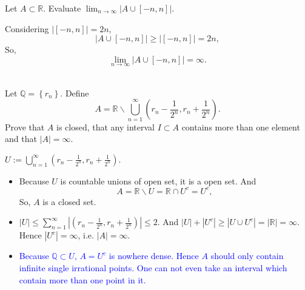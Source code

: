 \documentclass[en, normal, 11pt, black]{elegantnote}
\newenvironment{exercise}[1]{\begin{tcolorbox}[colback=black!15, colframe=black!80, breakable, title=#1]}{\end{tcolorbox}}
\renewenvironment{proof}{\begin{tcolorbox}[colback=white, colframe=black!50, breakable, title=Proof. ]\setlength{\parskip}{0.8em}}{\,\\\rightline{$\square$}\end{tcolorbox}}
\begin{document}
\begin{exercise}{(6), }
    Let $A \subset \mathbb{R}$. Evaluate $\lim _{n \rightarrow \infty}|A \cup[-n, n]|$. 
\end{exercise}

\begin{proof}
    Considering $|[-n,n]|=2n$, 
    \[|A\cup[-n,n]|\geqslant|[-n,n]|=2n, \]
    So, 
    \[\lim _{n \rightarrow \infty}|A \cup[-n, n]|=\infty. \]
    \vspace{-30pt}
\end{proof}

\begin{exercise}{(7), }
    Let $\mathbb{Q}=\left\{r_{n}\right\}$. Define
    \[
        A=\mathbb{R} \backslash \bigcup_{n=1}^{\infty}\left(r_{n}-\frac{1}{2^{n}}, r_{n}+\frac{1}{2^{n}}\right). 
    \]
    Prove that $A$ is closed, that any interval $I \subset A$ contains more than one element and that $|A|=\infty$. 
\end{exercise}
\begin{proof}
    $U:=\bigcup_{n=1}^{\infty}\left(r_{n}-\frac{1}{2^{n}}, r_{n}+\frac{1}{2^{n}}\right)$. 
    \begin{itemize}
        \item Because $U$ is countable unions of open set, it is a open set. And 
        \[
            A=\mathbb{R}\backslash U=\mathbb{R}\cap U^c=U^c, 
        \]  
        So, $A$ is a closed set. 
        \item $|U|\leqslant\sum_{n=1}^{\infty}|\left(r_{n}-\frac{1}{2^{n}}, r_{n}+\frac{1}{2^{n}}\right)|\leqslant2$. And $|U|+|U^c|\geqslant|U\cup U^c|=|\mathbb{R}|=\infty$. Hence $|U^c|=\infty$, i.e. $|A|=\infty$. 
        \item \textcolor{blue}{Because $\mathbb{Q}\subset U$, $A=U^c$ is nowhere dense. Hence $A$ should only contain infinite single irrational points. One can not even take an interval which contain more than one point in it. }
    \end{itemize}
    \vspace{-30pt}
\end{proof}
\end{document}
